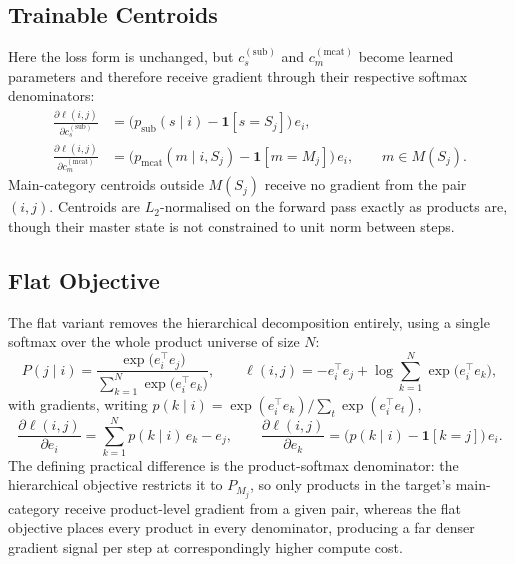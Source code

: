 \subsection{Trainable Centroids}
Here the loss form is unchanged, but $c^{(\text{sub})}_s$ and
$c^{(\text{mcat})}_m$ become learned parameters and therefore receive gradient
through their respective softmax denominators:
\begin{align}
  \frac{\partial\ell(i,j)}{\partial c^{(\text{sub})}_{s}}
    &= \big(p_{\text{sub}}(s\mid i) - \mathbf{1}[s=S_j]\big)\,e_i,
    \label{eq:emb-grad-csub}\\
  \frac{\partial\ell(i,j)}{\partial c^{(\text{mcat})}_{m}}
    &= \big(p_{\text{mcat}}(m\mid i,S_j) - \mathbf{1}[m=M_j]\big)\,e_i,
       \qquad m\in M(S_j).
    \label{eq:emb-grad-cmcat}
\end{align}
Main-category centroids outside $M(S_j)$ receive no gradient from the pair
$(i,j)$. Centroids are $L_2$-normalised on the forward pass exactly as products
are, though their master state is not constrained to unit norm between steps.

\subsection{Flat Objective}
The flat variant removes the hierarchical decomposition entirely, using a
single softmax over the whole product universe of size $N$:
\begin{equation}
  \label{eq:emb-flat}
  P(j\mid i) = \frac{\exp\!\big(e_i^\top e_j\big)}
                    {\sum_{k=1}^{N}\exp\!\big(e_i^\top e_k\big)},
  \qquad
  \ell(i,j) = -e_i^\top e_j
    + \log\!\sum_{k=1}^{N}\exp\!\big(e_i^\top e_k\big),
\end{equation}
with gradients, writing $p(k\mid i)=\exp(e_i^\top e_k)/\sum_t\exp(e_i^\top
e_t)$,
\begin{equation}
  \label{eq:emb-flat-grad}
  \frac{\partial\ell(i,j)}{\partial e_i} = \sum_{k=1}^{N} p(k\mid i)\,e_k - e_j,
  \qquad
  \frac{\partial\ell(i,j)}{\partial e_k}
    = \big(p(k\mid i) - \mathbf{1}[k=j]\big)\,e_i.
\end{equation}
The defining practical difference is the product-softmax denominator: the
hierarchical objective restricts it to $P_{M_j}$, so only products in the
target's main-category receive product-level gradient from a given pair,
whereas the flat objective places every product in every denominator, producing
a far denser gradient signal per step at correspondingly higher compute cost.

